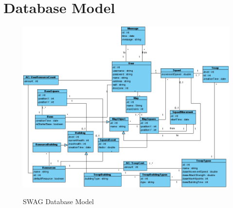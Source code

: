 \documentclass[a4paper]{article}
\begin{document}
\hspace*{0pt}

\clearpage


\section{Database Model}

\begin{figure}[ht!]
  \begin{center}
  \hspace*{-90pt}
  \includegraphics[scale=0.55]{fig/database_model.png}
  \label{fig:database_model}
	\caption{SWAG Database Model}
  \end{center}
\end{figure}

\hspace{0pt}

%
%
\end{document}
